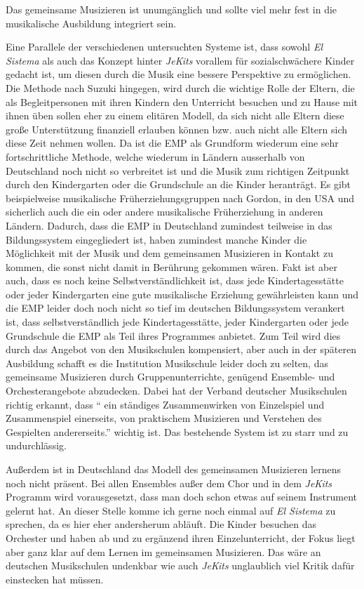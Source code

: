 
Das gemeinsame Musizieren ist
unumgänglich und sollte viel mehr fest in die musikalische Ausbildung integriert
sein.

Eine Parallele der verschiedenen untersuchten Systeme ist, dass sowohl \emph{El
Sistema} als auch das Konzept hinter \emph{JeKits} vorallem für sozialschwächere
Kinder gedacht ist, um diesen durch die Musik eine bessere Perspektive zu
ermöglichen. Die Methode nach Suzuki hingegen, wird durch die wichtige Rolle der
Eltern, die als Begleitpersonen mit ihren Kindern den Unterricht besuchen und zu
Hause mit ihnen üben sollen eher zu einem elitären Modell, da sich nicht alle
Eltern diese große Unterstützung finanziell erlauben können bzw. auch nicht alle
Eltern sich diese Zeit nehmen wollen. Da ist die EMP als Grundform wiederum eine
sehr fortschrittliche Methode, welche wiederum in Ländern ausserhalb von
Deutschland noch nicht so verbreitet ist und die Musik zum richtigen Zeitpunkt
durch den Kindergarten oder die Grundschule an die Kinder heranträgt. Es gibt
beispielweise musikalische Früherziehungsgruppen nach Gordon, in den USA und
sicherlich auch die ein oder andere musikalische Früherziehung in anderen
Ländern. Dadurch, dass die EMP in Deutschland zumindest teilweise in das
Bildungssystem eingegliedert ist, haben zumindest manche Kinder die Möglichkeit
mit der Musik und dem gemeinsamen Musizieren in Kontakt zu kommen, die sonst
nicht damit in Berührung gekommen wären. Fakt ist aber auch, dass es noch keine
Selbstverständlichkeit ist, dass jede Kindertagesstätte oder jeder Kindergarten
eine gute musikalische Erziehung gewährleisten kann und die EMP leider doch noch
nicht so tief im deutschen Bildungssystem verankert ist, dass selbstverständlich
jede Kindertagesstätte, jeder Kindergarten oder jede Grundschule die EMP als
Teil ihres Programmes anbietet. Zum Teil wird dies durch das Angebot von den
Musikschulen kompensiert, aber auch in der späteren Ausbildung schafft es die
Institution Musikschule leider doch zu selten, das gemeinsame Musizieren durch
Gruppenunterrichte, genügend Ensemble- und Orchesterangebote abzudecken. Dabei
hat der Verband deutscher Musikschulen richtig erkannt, dass \enquote{\textelp{} ein
ständiges Zusammenwirken von Einzelspiel und Zusammenspiel einerseits, von
praktischem Musizieren und Verstehen des Gespielten andererseits.} wichtig ist.
\autocite[22]{losert:die_kunst_zu_unterrichten} Das bestehende System ist zu
starr und zu undurchlässig.

Außerdem ist in Deutschland das Modell des gemeinsamen Musizieren lernens noch nicht präsent. 
Bei allen Ensembles außer dem Chor und in
dem \emph{JeKits} Programm wird vorausgesetzt, dass man doch schon etwas auf seinem
Instrument gelernt hat. An dieser Stelle komme ich gerne noch einmal auf \emph{El
Sistema} zu sprechen, da es hier eher andersherum abläuft. Die Kinder besuchen
das Orchester und haben ab und zu ergänzend ihren Einzelunterricht, der Fokus
liegt aber ganz klar auf dem Lernen im gemeinsamen Musizieren. Das wäre an
deutschen Musikschulen undenkbar wie auch \emph{JeKits} unglaublich viel Kritik dafür
einstecken hat müssen.


